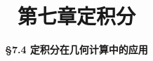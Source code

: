 \everymath{\displaystyle}
\usetikzlibrary{lindenmayersystems, intersections, calc}



\title[第七章\\
定积分]{\texorpdfstring{\LARGE \bfseries 第七章\quad 定积分}{第七章 定积分}} %
\author[\smaller \S 7.4\\
几何计算中的应用] %
{\Large \bfseries \S 7.4 定积分在几何计算中的应用}
\date{}





\begin{frame}

\titlepage %

\end{frame}





